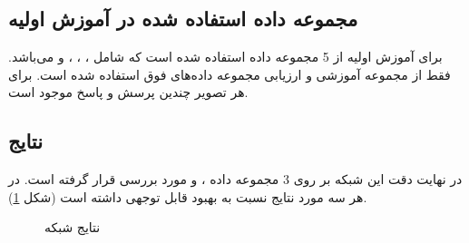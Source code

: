 \subsection{مجموعه داده استفاده شده در آموزش اولیه}
برای آموزش اولیه از 5 مجموعه داده استفاده شده است که شامل 
،
،
،
و
می‌باشد. فقط از مجموعه آموزشی
و ارزیابی
مجموعه داده‌های فوق استفاده شده است. برای هر تصویر چندین پرسش و پاسخ موجود است.

\subsection{نتایج}
	در نهایت  دقت این شبکه بر روی 3 مجموعه داده 
	،
	و
	مورد بررسی قرار گرفته است. در هر سه مورد نتایج نسبت به
	بهبود قابل توجهی داشته است (شکل
	\ref{lxmert-result}).
	\begin{figure}[H]
		\caption{نتایج شبکه 
			\cite{tan2019lxmert}}
		\label{lxmert-result}
	\end{figure}